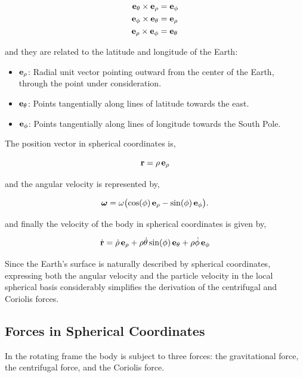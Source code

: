 \documentclass[12pt]{article}
\begin{document}
\begin{align}
  \vb{e}_\theta \times \vb{e}_\rho &= \vb{e}_\phi \\
  \vb{e}_\phi   \times \vb{e}_\theta &= \vb{e}_\rho \\
  \vb{e}_\rho   \times \vb{e}_\phi &= \vb{e}_\theta
\end{align}

and they are related to the latitude and longitude of the Earth:

\begin{itemize}
  \item $\vb{e}_\rho$: Radial unit vector pointing outward from the center of the Earth,
        through the point under consideration.
  \item $\vb{e}_\theta$: Points tangentially along lines of latitude towards the east.
  \item $\vb{e}_\phi$: Points tangentially along lines of longitude towards the South Pole.
\end{itemize}

The position vector in spherical coordinates is,

\[
  \vb{r} = \rho\,\vb{e}_\rho
\]

and the angular velocity is represented by,

\[
  \boldsymbol{\omega} = \omega\bigl(\cos(\phi)\,\vb{e}_\rho - \sin(\phi)\,\vb{e}_\phi\bigr).
\]

and finally the velocity of the body in spherical coordinates is given by,

\[
  \dot{\vb{r}} = \dot\rho\,\vb{e}_\rho + \rho\dot\theta\sin(\phi)\,\vb{e}_\theta
    + \rho\dot\phi\,\vb{e}_\phi
\]

Since the Earth's surface is naturally described by 
spherical coordinates, expressing both the angular velocity and the particle
 velocity in the local spherical basis considerably simplifies the derivation
  of the centrifugal and Coriolis forces.

\subsection{Forces in Spherical Coordinates}

In the rotating frame the body is subject to three forces: the gravitational force, the
centrifugal force, and the Coriolis force.
\end{document}
